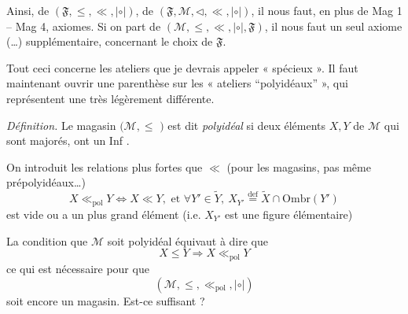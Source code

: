 \documentclass[11pt,a4paper]{article}
\begin{document}
Ainsi,  de $(\mathfrak{F}, \leq, \ll, |\circ|)$,
 de $(\mathfrak{F}, \mathcal{M}, \lhd, \ll, |\circ|)$, il nous
faut, en plus de Mag 1 -- Mag 4,  axiomes. Si on part de
$(\mathcal{M}, \leq, \ll, |\circ|, \mathfrak{F})$, il nous faut un seul axiome
(…) supplémentaire, concernant le choix de
$\mathfrak{F}$.

Tout ceci concerne les ateliers que je devrais  appeler
« spécieux ». Il faut maintenant ouvrir une parenthèse sur les « ateliers
“polyidéaux” », qui représentent une   très
légèrement différente.

\emph{Définition.} Le magasin $(\mathcal{M}, \leq$ \ill{}$)$ est dit
\emph{polyidéal}  si deux éléments
$X, Y$ de $\mathcal{M}$ qui sont majorés, ont un Inf .


On introduit \struck{\ill{}} les relations plus fortes que $\ll$ (pour les
magasins, pas même prépolyidéaux…)
\[
  X \ll_{\mathrm{pol}} Y \Longleftrightarrow X \ll Y, \text{ et }
  \forall Y' \in \widetilde{Y},\ X_{Y'} \overset{\mathrm{def}}{=}
  \widetilde{X} \cap \mathrm{Ombr}(Y')
\]
est vide ou a un plus grand élément (i.e. $X_{Y'}$ est une figure élémentaire)


La condition que $\mathcal{M}$ soit polyidéal \struck{\ill{}} équivaut à
dire que
\[
  X \leq Y \Longrightarrow X \ll_{\mathrm{pol}} Y
\]
ce qui est nécessaire pour que
\[
  (\mathcal{M}, \leq, \ll_{\mathrm{pol}}, |\circ|)
\]
soit encore un magasin. Est-ce suffisant ?
\end{document}
